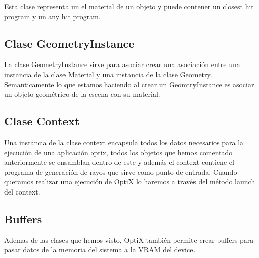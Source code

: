 Esta clase representa un el material de un objeto y puede contener un closest hit program y un any hit program.

\subsection{Clase GeometryInstance}

La clase GeometryInstance sirve para asociar crear una asociación entre una instancia de la clase Material y una instancia de la clase Geometry. Semanticamente lo que estamos haciendo al crear un GeomtryInstance es asociar un objeto geométrico de la escena con su material.

\subsection{Clase Context}

Una instancia de la clase context encapsula todos los datos necesarios para la ejecución de una aplicación optix, todos los objetos que hemos comentado anteriormente se ensamblan dentro de este y además el context contiene el programa de generación de rayos que sirve como punto de entrada. Cuando queramos realizar una ejecución de OptiX lo haremos a través del método launch del context.

\subsection{Buffers}

Ademas de las clases que hemos visto, OptiX también permite crear buffers para pasar datos de la memoria del sistema a la VRAM del device.
